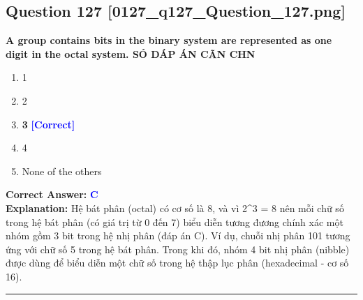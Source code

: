 \documentclass[11pt,a4paper]{article}
\begin{document}
\begin{minipage}{\textwidth}
\subsection*{Question 127 \quad \footnotesize{[0127\_q127\_Question\_127.png]}}
\noindent \textbf{A group contains bits in the binary system are represented as one digit in the octal system. SÓ DÁP ÁN CÃN CHN}

\begin{enumerate}[label=\Alph*.]
    \item 1
    \item 2
    \item \textbf{3} \hfill \textcolor{blue}{\textbf{[Correct]}}
    \item 4
    \item None of the others
\end{enumerate}

\noindent \textbf{Correct Answer:} \textcolor{blue}{\textbf{C}} \\[2pt]
\noindent \textbf{Explanation:} Hệ bát phân (octal) có cơ số là 8, và vì 2\textasciicircum{}3 = 8 nên mỗi chữ số trong hệ bát phân (có giá trị từ 0 đến 7) biểu diễn tương đương chính xác một nhóm gồm 3 bit trong hệ nhị phân (đáp án C). Ví dụ, chuỗi nhị phân 101 tương ứng với chữ số 5 trong hệ bát phân. Trong khi đó, nhóm 4 bit nhị phân (nibble) được dùng để biểu diễn một chữ số trong hệ thập lục phân (hexadecimal - cơ số 16).

\par\vspace{0.3cm}
\hrule
\vspace{0.3cm}
\end{minipage}
\end{document}
